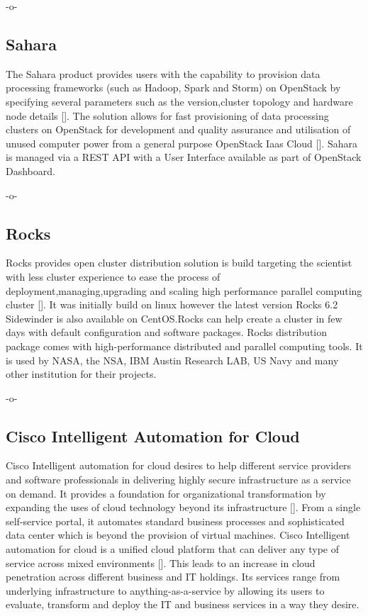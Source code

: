      -o-

\subsection{Sahara}

The Sahara product provides users with the capability to provision
data processing frameworks (such as Hadoop, Spark and Storm) on
OpenStack by specifying several parameters such as the version,cluster
topology and hardware node details [\cite{www-openStack}]. The solution
allows for fast provisioning of data processing clusters on OpenStack
for development and quality assurance and utilisation of unused
computer power from a general purpose OpenStack Iaas
Cloud [\cite{www-Sahara}].  Sahara is managed via a REST API with a User
Interface available as part of OpenStack Dashboard.

     -o-

\subsection{Rocks}

Rocks provides open cluster distribution solution is build targeting
the scientist with less cluster experience to ease the process of
deployment,managing,upgrading and scaling high performance parallel
computing cluster [\cite{www-rockscluster}].  It was initially build on
linux however the latest version Rocks 6.2 Sidewinder is also
available on CentOS.Rocks can help create a cluster in few days with
default configuration and software packages.  Rocks distribution
package comes with high-performance distributed and parallel computing
tools. It is used by NASA, the NSA, IBM Austin Research LAB, US Navy
and many other institution for their projects.

     -o-

\subsection{Cisco Intelligent Automation for Cloud}

Cisco Intelligent automation for cloud desires to help different
service providers and software professionals in delivering highly
secure infrastructure as a service on demand. It provides a foundation
for organizational transformation by expanding the uses of cloud
technology beyond its infrastructure [\cite{cis1}]. From a single
self-service portal, it automates standard business processes and
sophisticated data center which is beyond the provision of virtual
machines. Cisco Intelligent automation for cloud is a unified cloud
platform that can deliver any type of service across mixed
environments [\cite{cis2}]. This leads to an increase in cloud
penetration across different business and IT holdings. Its services
range from underlying infrastructure to anything-as-a-service by
allowing its users to evaluate, transform and deploy the IT and
business services in a way they desire.

